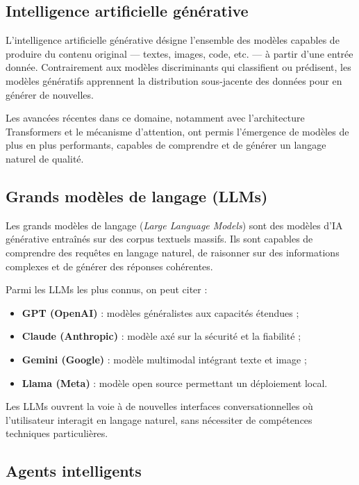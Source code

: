 \subsection{Intelligence artificielle générative}

L'intelligence artificielle générative désigne l'ensemble des modèles capables de produire du contenu original — textes, images, code, etc. — à partir d'une entrée donnée. Contrairement aux modèles discriminants qui classifient ou prédisent, les modèles génératifs apprennent la distribution sous-jacente des données pour en générer de nouvelles.

Les avancées récentes dans ce domaine, notamment avec l'architecture Transformers et le mécanisme d'attention, ont permis l'émergence de modèles de plus en plus performants, capables de comprendre et de générer un langage naturel de qualité.

\subsection{Grands modèles de langage (LLMs)}

Les grands modèles de langage (\textit{Large Language Models}) sont des modèles d'IA générative entraînés sur des corpus textuels massifs. Ils sont capables de comprendre des requêtes en langage naturel, de raisonner sur des informations complexes et de générer des réponses cohérentes.

Parmi les LLMs les plus connus, on peut citer :

\begin{itemize}
  \item \textbf{GPT (OpenAI)} : modèles généralistes aux capacités étendues ;
  \item \textbf{Claude (Anthropic)} : modèle axé sur la sécurité et la fiabilité ;
  \item \textbf{Gemini (Google)} : modèle multimodal intégrant texte et image ;
  \item \textbf{Llama (Meta)} : modèle open source permettant un déploiement local.
\end{itemize}

Les LLMs ouvrent la voie à de nouvelles interfaces conversationnelles où l'utilisateur interagit en langage naturel, sans nécessiter de compétences techniques particulières.

\subsection{Agents intelligents}

